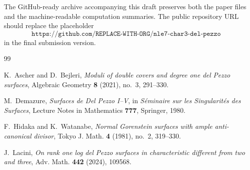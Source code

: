 \documentclass[11pt]{article}
\newcommand{\repourl}{\texttt{https://github.com/REPLACE-WITH-ORG/nle7-char3-del-pezzo}}
\theoremstyle{definition}
\begin{document}
The GitHub-ready archive accompanying this draft preserves both the paper files and the machine-readable computation summaries. The public repository URL should replace the placeholder
\[
\repourl
\]
in the final submission version.

\begin{thebibliography}{99}

K.~Ascher and D.~Bejleri,
\emph{Moduli of double covers and degree one del Pezzo surfaces},
Algebraic Geometry \textbf{8} (2021), no.~3, 291--330.

M.~Demazure,
\emph{Surfaces de Del Pezzo I--V},
in \emph{S\'eminaire sur les Singularit\'es des Surfaces},
Lecture Notes in Mathematics \textbf{777}, Springer, 1980.

F.~Hidaka and K.~Watanabe,
\emph{Normal Gorenstein surfaces with ample anti-canonical divisor},
Tokyo J. Math. \textbf{4} (1981), no.~2, 319--330.

J.~Lacini,
\emph{On rank one log del Pezzo surfaces in characteristic different from two and three},
Adv. Math. \textbf{442} (2024), 109568.

\end{thebibliography}
\end{document}
